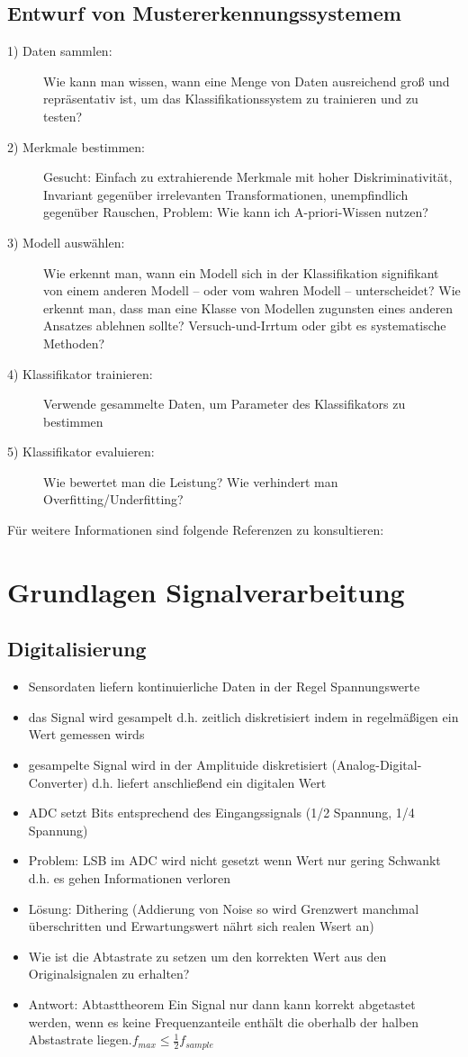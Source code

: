 \documentclass{article} %
\begin{document}
	\subsection{Entwurf von Mustererkennungssystemem}
	\begin{description}
		\item[1) Daten sammlen:] Wie kann man wissen, wann eine Menge von Daten ausreichend groß und repräsentativ ist, um das Klassifikationssystem zu trainieren und zu testen? 
		\item[2) Merkmale bestimmen:] Gesucht: Einfach zu extrahierende Merkmale mit hoher Diskriminativität, Invariant gegenüber irrelevanten Transformationen, unempfindlich gegenüber Rauschen, Problem: Wie kann ich A-priori-Wissen nutzen?
		\item[3) Modell auswählen:] Wie erkennt man, wann ein Modell sich in der Klassifikation signifikant von einem anderen Modell – oder vom wahren Modell – unterscheidet? Wie erkennt man, dass man eine Klasse von Modellen zugunsten eines anderen Ansatzes ablehnen sollte? Versuch-und-Irrtum oder gibt es systematische Methoden?
		\item[4) Klassifikator trainieren:] Verwende gesammelte Daten, um Parameter des Klassifikators zu bestimmen
		\item[5) Klassifikator evaluieren:] Wie bewertet man die Leistung? Wie verhindert man Overfitting/Underfitting?
	\end{description}
	Für weitere Informationen sind folgende Referenzen zu konsultieren: \cite[S. 3-16]{dudaPattern}
\section{Grundlagen Signalverarbeitung}
	\subsection{Digitalisierung}
	\begin{itemize}
		\item Sensordaten liefern kontinuierliche Daten in der Regel Spannungswerte
		\item das Signal wird gesampelt d.h. zeitlich diskretisiert indem in regelmäßigen ein Wert gemessen wirds
		\item gesampelte Signal wird in der Amplituide diskretisiert (Analog-Digital-Converter) d.h. liefert anschließend ein digitalen Wert
		\item ADC setzt Bits entsprechend des Eingangssignals  (1/2 Spannung, 1/4 Spannung)
		\item Problem: LSB im ADC wird nicht gesetzt wenn Wert nur gering Schwankt d.h. es gehen Informationen verloren
		\item Lösung: Dithering (Addierung von Noise so wird Grenzwert manchmal überschritten und Erwartungswert nährt sich realen Wsert an)
		\item Wie ist die Abtastrate zu setzen um den korrekten Wert aus den Originalsignalen zu erhalten?
		\item Antwort: Abtasttheorem \glqq Ein Signal nur dann kann korrekt abgetastet werden, wenn es keine Frequenzanteile enthält die oberhalb der halben Abstastrate liegen.\grqq $f_{max} \leq \frac{1}{2} f_{sample}$
	\end{itemize}
\end{document}
